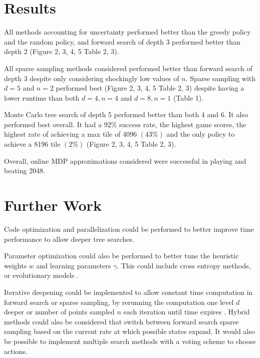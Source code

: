 \documentclass[conference]{IEEEtran}
\begin{document}
\section{Results}

All methods accounting for uncertainty performed better than the greedy policy and the random policy, and forward search of depth 3 performed better than depth 2 (Figure 2, 3, 4, 5 Table 2, 3).

All sparse sampling methods considered performed better than forward search of depth 3 despite only considering shockingly low values of $n$. Sparse sampling with $d=5$ and $n=2$ performed best (Figure 2, 3, 4, 5 Table 2, 3) despite having a lower runtime than both $d=4,n=4$ and $d=8,n=1$ (Table 1).

Monte Carlo tree search of depth 5 performed better than both 4 and 6. It also performed best overall. It had a $92\%$ success rate, the highest game scores, the highest rate of achieving a max tile of 4096 $(43\%)$ and the only policy to achieve a 8196 tile $(2\%)$ (Figure 2, 3, 4, 5 Table 2, 3).

Overall, online MDP approximations considered were successful in playing and beating 2048.

\begin{figure}[htbp]
	\caption{}
	\label{fig}
\end{figure}

\begin{figure}[htbp]
	\caption{}
	\label{fig}
\end{figure}

\section{Further Work}
Code optimization and parallelization could be performed to better improve time performance to allow deeper tree searches.

Parameter optimization could also be performed to better tune the heuristic weights $w$ and learning parameters $\gamma$. This could include cross entropy methods, or evolutionary models \cite{d}.

Iterative deepening could be implemented to allow constant time computation in forward search or sparse sampling, by rerunning the computation one level $d$ deeper or number of points sampled $n$ each iteration until time expires \cite{ai}. Hybrid methods could also be considered that switch between forward search sparse sampling based on the current rate at which possible states expand. It would also be possible to implement multiple search methods with a voting scheme to choose actions.




\newpage
\begin{figure*}[]
	\caption{}
	\label{fig}
	\caption{}
	\label{fig}
\end{figure*}
\end{document}
